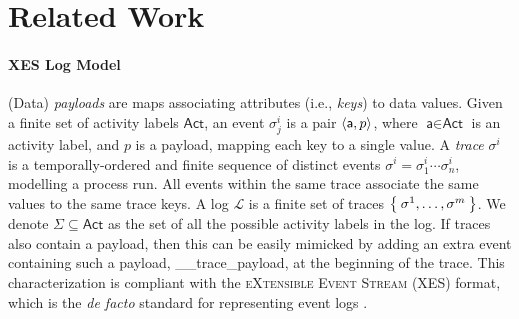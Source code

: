 \section{Related Work}


\paragraph*{XES Log Model}\label{sec:XES}


(Data) \textit{payloads} are maps  associating attributes (i.e., \textit{keys}) to data values. 
Given a finite set of activity labels $\textsf{Act}$, an event $\sigma_j^{i}$ is a pair $\Braket{\textsf{a},p}$, where $\textsf{a}\in\textsf{Act}$ is an activity label, and $p$ is a payload, mapping each key to a single value. 
A \textit{trace} $\sigma^i$ is a temporally-ordered and finite sequence of distinct events $\sigma^i=\sigma_1^i\cdots\sigma_n^i$, modelling a process run. 
All events within the same trace associate the same values to the same trace keys. 
A log $\mathcal{L}$ is a finite set of traces $\Set{\sigma^1,\dots,\sigma^m}$. We denote  $\Sigma\subseteq\textsf{Act}$ as the set of all the possible activity labels in the log. If traces also contain a payload, then this can be easily mimicked by adding an extra event containing such a payload, \textsf{\_\_trace\_payload}, at the beginning of the trace.  This  characterization \cite{bpm21} is compliant with the \textsc{eXtensible Event Stream} (XES) format, which is the \textit{de facto} standard for representing event logs %
\cite{XES}. 
